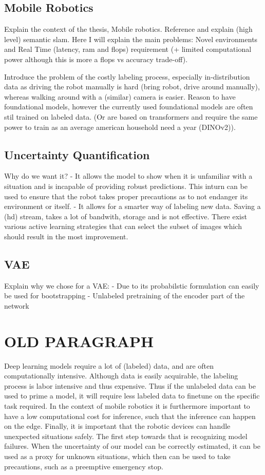 \subsection*{Mobile Robotics}
Explain the context of the thesis, Mobile robotics. Reference and explain (high level) semantic slam.
Here I will explain the main problems: Novel environments and Real Time (latency, ram and flops) requirement (+ limited computational power although this is more a flops vs accuracy trade-off).

Introduce the problem of the costly labeling process, especially in-distribution data as driving the robot manually is hard (bring robot, drive around manually), whereas walking around with a (similar) camera is easier. Reason to have foundational models, however the currently used foundational models are often stil trained on labeled data. (Or are based on transformers and require the same power to train as an average american household need a year (DINOv2)).

\subsection*{Uncertainty Quantification}
Why do we want it?
- It allows the model to show when it is unfamiliar with a situation and is incapable of providing robust predictions. This inturn can be used to ensure that the robot takes proper precautions as to not endanger its environment or itself.
- It allows for a smarter way of labeling new data. Saving a (hd) stream, takes a lot of bandwith, storage and is not effective. There exist various active learning strategies that can select the subset of images which should result in the most improvement.


\subsection*{VAE}
Explain why we chose for a VAE:
- Due to its probabilstic formulation can easily be used for bootstrapping
- Unlabeled pretraining of the encoder part of the network


\section*{OLD PARAGRAPH}
Deep learning models require a lot of (labeled) data, and are often computationally intensive. Although data is easily acquirable, the labeling process is labor intensive and thus expensive. Thus if the unlabeled data can be used to prime a model, it will require less labeled data to finetune on the specific task required. In the context of mobile robotics it is furthermore important to have a low computational cost for inference, such that the inference can happen on the edge. Finally, it is important that the robotic devices can handle unexpected situations safely. The first step towards that is recognizing model failures. When the uncertainty of our model can be correctly estimated, it can be used as a proxy for unknown situations, which then can be used to take precautions, such as a preemptive emergency stop.

